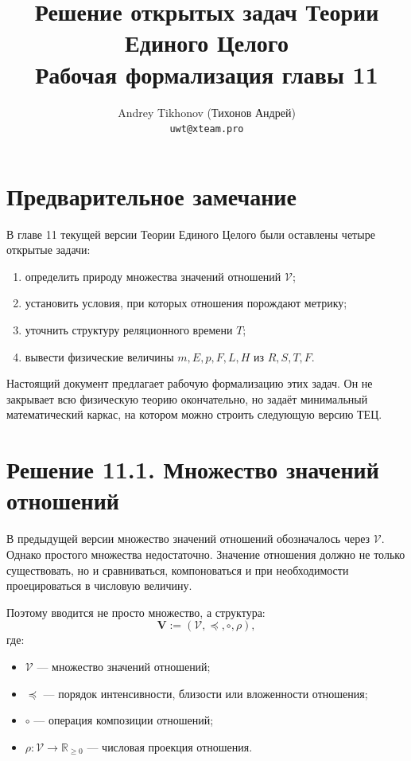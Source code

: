\documentclass[12pt,a4paper]{article}
\title{\textbf{Решение открытых задач Теории Единого Целого}\\[0.5em]
\large Рабочая формализация главы 11}
\author{Andrey Tikhonov (Тихонов Андрей)\\\texttt{uwt@xteam.pro}}
\date{}
\newcommand{\Rel}{R}
\newcommand{\Values}{\mathcal V}
\newcommand{\Vstruct}{\mathbf V}
\newcommand{\State}{S}
\begin{document}
\maketitle
\tableofcontents
\newpage

\section*{Предварительное замечание}

В главе 11 текущей версии Теории Единого Целого были оставлены четыре открытые задачи:

\begin{enumerate}
    \item определить природу множества значений отношений \(\Values\);
    \item установить условия, при которых отношения порождают метрику;
    \item уточнить структуру реляционного времени \(T\);
    \item вывести физические величины \(m,E,p,F,L,H\) из \(\Rel,\State,T,F\).
\end{enumerate}

Настоящий документ предлагает рабочую формализацию этих задач. Он не закрывает всю физическую теорию окончательно, но задаёт минимальный математический каркас, на котором можно строить следующую версию ТЕЦ.

\section{Решение 11.1. Множество значений отношений}

В предыдущей версии множество значений отношений обозначалось через \(\Values\). Однако простого множества недостаточно. Значение отношения должно не только существовать, но и сравниваться, компоноваться и при необходимости проецироваться в числовую величину.

Поэтому вводится не просто множество, а структура:
\[
\Vstruct := (\Values,\preceq,\circ,\rho),
\]
где:
\begin{itemize}
    \item \(\Values\) --- множество значений отношений;
    \item \(\preceq\) --- порядок интенсивности, близости или вложенности отношения;
    \item \(\circ\) --- операция композиции отношений;
    \item \(\rho:\Values\to\mathbb R_{\ge0}\) --- числовая проекция отношения.
\end{itemize}
\end{document}
